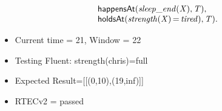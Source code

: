 \documentclass[8pt]{beamer}
\DeclareMathOperator{\val}{=}  %
\def \patsize {}
\def\happensAt{\textsf{\patsize happensAt}}
\def\holdsAt{\textsf{\patsize holdsAt}}
\newenvironment{mysplit}%
  {\arraycolsep 0pt \begin{array}{l}}%
  {\end{array}}
\begin{document}
\begin{frame}
\begin{minipage}{0.55\linewidth}
\begin{align*}
\begin{mysplit}
                \quad    \happensAt\mathit{(sleep\_end(X),T),}\\
                \quad    \holdsAt\mathit{(strength(X)\val tired),T).}\\
            \end{mysplit}
        \end{align*}
    \end{minipage}
    \begin{itemize}
        \item Current time = 21, Window = 22
        \item Testing Fluent: strength(chris)=full
        \item Expected Result=[[(0,10),(19,inf)]]
        \item RTECv2 = passed
    \end{itemize}
\end{frame}
\end{document}
